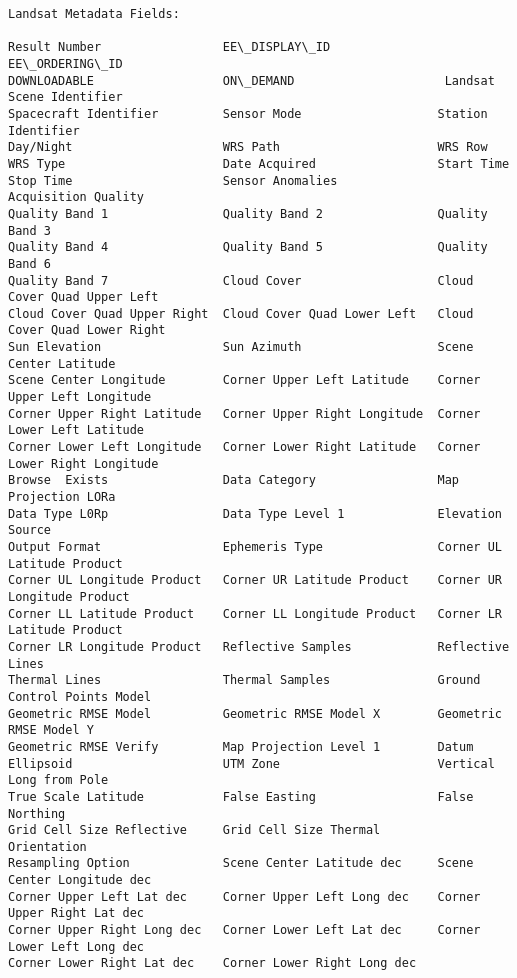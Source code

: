 \documentclass{article}
\begin{document}
    \begin{Verbatim}[commandchars=\\\{\}]
Landsat Metadata Fields:

Result Number                 EE\_DISPLAY\_ID                 EE\_ORDERING\_ID
DOWNLOADABLE                  ON\_DEMAND                     Landsat Scene Identifier
Spacecraft Identifier         Sensor Mode                   Station Identifier
Day/Night                     WRS Path                      WRS Row
WRS Type                      Date Acquired                 Start Time
Stop Time                     Sensor Anomalies              Acquisition Quality
Quality Band 1                Quality Band 2                Quality Band 3
Quality Band 4                Quality Band 5                Quality Band 6
Quality Band 7                Cloud Cover                   Cloud Cover Quad Upper Left
Cloud Cover Quad Upper Right  Cloud Cover Quad Lower Left   Cloud Cover Quad Lower Right
Sun Elevation                 Sun Azimuth                   Scene Center Latitude
Scene Center Longitude        Corner Upper Left Latitude    Corner Upper Left Longitude
Corner Upper Right Latitude   Corner Upper Right Longitude  Corner Lower Left Latitude
Corner Lower Left Longitude   Corner Lower Right Latitude   Corner Lower Right Longitude
Browse  Exists                Data Category                 Map Projection LORa
Data Type L0Rp                Data Type Level 1             Elevation Source
Output Format                 Ephemeris Type                Corner UL Latitude Product
Corner UL Longitude Product   Corner UR Latitude Product    Corner UR Longitude Product
Corner LL Latitude Product    Corner LL Longitude Product   Corner LR Latitude Product
Corner LR Longitude Product   Reflective Samples            Reflective Lines
Thermal Lines                 Thermal Samples               Ground Control Points Model
Geometric RMSE Model          Geometric RMSE Model X        Geometric RMSE Model Y
Geometric RMSE Verify         Map Projection Level 1        Datum
Ellipsoid                     UTM Zone                      Vertical Long from Pole
True Scale Latitude           False Easting                 False Northing
Grid Cell Size Reflective     Grid Cell Size Thermal        Orientation
Resampling Option             Scene Center Latitude dec     Scene Center Longitude dec
Corner Upper Left Lat dec     Corner Upper Left Long dec    Corner Upper Right Lat dec
Corner Upper Right Long dec   Corner Lower Left Lat dec     Corner Lower Left Long dec
Corner Lower Right Lat dec    Corner Lower Right Long dec
    \end{Verbatim}
\end{document}
